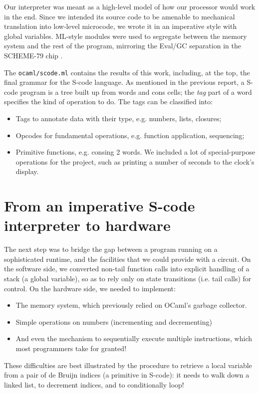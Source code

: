 \documentclass[a4paper, 11pt]{article}
\begin{document}
Our interpreter was meant as a high-level model of how our processor would work in the end. Since  we intended its source code to be amenable to mechanical translation into low-level microcode, we wrote it in an imperative style with global variables. ML-style modules were used to segregate between the memory system and the rest of the program, mirroring the Eval/GC separation in the SCHEME-79 chip \cite{SCHEME-79}.

The \texttt{ocaml/scode.ml} contains the results of this work, including, at the top, the final grammar for the S-code language. As mentioned in the previous report, a S-code program is a tree built up from words and cons cells; the \emph{tag} part of a word specifies the kind of operation to do. The tags can be classified into:
\begin{itemize}
\item Tags to annotate data with their type, e.g. numbers, lists, closures;
\item Opcodes for fundamental operations, e.g. function application, sequencing;
\item Primitive functions, e.g. consing 2 words. We included a lot of special-purpose operations for the project, such as printing a number of seconds to the clock's display.
\end{itemize}

\section{From an imperative S-code interpreter to hardware}

The next step was to bridge the gap between a program running on a sophisticated runtime, and the facilities that we could provide with a circuit. On the software side, we converted non-tail function calls into explicit handling of a stack (a global variable), so as to rely only on state transitions (i.e. tail calls) for control. On the hardware side, we needed to implement:
\begin{itemize}
\item The memory system, which previously relied on OCaml's garbage collector.
\item Simple operations on numbers (incrementing and decrementing)
\item And even the mechanism to sequentially execute multiple instructions, which most programmers take for granted!
\end{itemize}
These difficulties are best illustrated by the procedure to retrieve a local variable from a pair of de Bruijn indices (a primitive in S-code): it needs to walk down a linked list, to decrement indices, and to conditionally loop!
\end{document}
